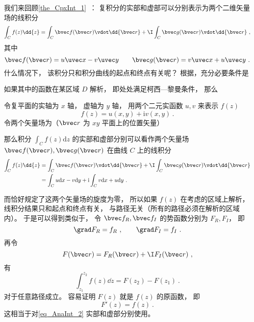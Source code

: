 
\begin{issues}
\issueDraft
\end{issues}


我们来回顾\autoref{the_CpxInt_1}~： 复积分的实部和虚部可以分别表示为两个二维矢量场的线积分
\begin{equation}
\int_{C} f(z) \dd{z} = \int_C \bvec f(\bvec r) \vdot \dd{\bvec r} + \I \int_C \bvec g(\bvec r) \vdot \dd{\bvec r}~,
\end{equation}
其中
\begin{equation}
\bvec f(\bvec r) = u\uvec x - v\uvec y
\qquad
\bvec g(\bvec r) = v\uvec x + u\uvec y~.
\end{equation}
什么情况下， 该积分只和积分曲线的起点和终点有关呢？ 根据，充分必要条件是

如果其中的函数在某区域 $D$ 解析， 即处处满足柯西—黎曼条件， 那么


\begin{theorem}{}
令复平面的实轴为 $x$ 轴， 虚轴为 $y$ 轴， 用两个二元实函数 $u, v$ 来表示 $f(z)$
\begin{equation}
f (z) = u(x, y) + \mathrm iv(x, y)~.
\end{equation}
令两个矢量场为（$\bvec r$ 为 $xy$ 平面上的位置矢量）

那么积分 $\int_{C} f(z) \mathrm{d} z$ 的实部和虚部分别可以看作两个矢量场 $\bvec f(\bvec r), \bvec g(\bvec r)$ 在曲线 $C$ 上的线积分
\begin{equation}
\begin{aligned}
\int_{C} f(z) \dd{z} &= \int_C \bvec f(\bvec r) \vdot \dd{\bvec r} + \I \int_C \bvec g(\bvec r) \vdot \dd{\bvec r}\\
&= \int_{C} u \mathrm{d} x-v \mathrm{d} y+\mathrm{i} \int_{C} v \mathrm{d} x+u \mathrm{d} y~.
\end{aligned}
\end{equation}
\end{theorem}

而恰好规定了这两个矢量场的旋度为零， 所以如果 $f(z)$ 在考虑的区域上解析， 线积分结果只和起点和终点有关， 与路径无关（所有的路径必须在解析的区域内）。 于是可以得到类似于， 令 $\bvec f_R, \bvec f_I$ 的势函数分别为 $F_R, F_I$， 即
\begin{equation}
\grad F_R = f_R~,
\qquad
\grad F_I = f_I~.
\end{equation}
再令
\begin{equation}
F(\bvec r) = F_R(\bvec r) + \I F_I(\bvec r)~,
\end{equation}
有
\begin{equation}\label{eq_AnaInt_2}
\int_{z_1}^{z_2} f(z) \dd{z} = F(z_2) - F(z_1)~.
\end{equation}
对于任意路径成立。 容易证明 $F(z)$ 就是 $f(z)$ 的原函数， 即
\begin{equation}
F'(z) = f(z)~.
\end{equation}
这相当于对\autoref{eq_AnaInt_2} 实部和虚部分别使用。
